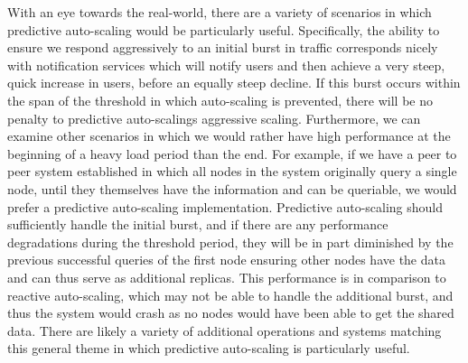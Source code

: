 With an eye towards the real-world, there are a variety of scenarios in which
predictive auto-scaling would be particularly useful. Specifically, the ability
to ensure we respond aggressively to an initial burst in traffic corresponds
nicely with notification services which will notify users and then achieve a
very steep, quick increase in users, before an equally steep decline. If this
burst occurs within the span of the threshold in which auto-scaling is
prevented, there will be no penalty to predictive auto-scalings aggressive
scaling. Furthermore, we can examine other scenarios in which we would rather
have high performance at the beginning of a heavy load period than the end. For
example, if we have a peer to peer system established in which all nodes in the
system originally query a single node, until they themselves have the
information and can be queriable, we would prefer a predictive auto-scaling
implementation. Predictive auto-scaling should sufficiently handle the initial
burst, and if there are any performance degradations during the threshold
period, they will be in part diminished by the previous successful queries of
the first node ensuring other nodes have the data and can thus serve as
additional replicas. This performance is in comparison to reactive auto-scaling,
which may not be able to handle the additional burst, and thus the system would
crash as no nodes would have been able to get the shared data. There are likely
a variety of additional operations and systems matching this general theme in
which predictive auto-scaling is particularly useful.
